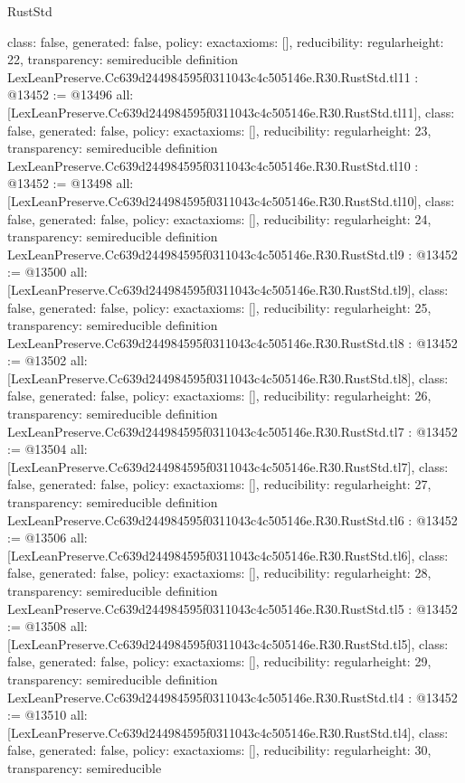 \begin{lexlean}{RustStd}
\begin{coremodule}
{  class: false,
  generated: false,
  policy: exact{axioms: []},
  reducibility: regular{height: 22},
  transparency: semireducible
}
definition LexLeanPreserve.Cc639d244984595f0311043c4c505146e.R30.RustStd.tl11 : @13452 := @13496 {
  all: [LexLeanPreserve.Cc639d244984595f0311043c4c505146e.R30.RustStd.tl11],
  class: false,
  generated: false,
  policy: exact{axioms: []},
  reducibility: regular{height: 23},
  transparency: semireducible
}
definition LexLeanPreserve.Cc639d244984595f0311043c4c505146e.R30.RustStd.tl10 : @13452 := @13498 {
  all: [LexLeanPreserve.Cc639d244984595f0311043c4c505146e.R30.RustStd.tl10],
  class: false,
  generated: false,
  policy: exact{axioms: []},
  reducibility: regular{height: 24},
  transparency: semireducible
}
definition LexLeanPreserve.Cc639d244984595f0311043c4c505146e.R30.RustStd.tl9 : @13452 := @13500 {
  all: [LexLeanPreserve.Cc639d244984595f0311043c4c505146e.R30.RustStd.tl9],
  class: false,
  generated: false,
  policy: exact{axioms: []},
  reducibility: regular{height: 25},
  transparency: semireducible
}
definition LexLeanPreserve.Cc639d244984595f0311043c4c505146e.R30.RustStd.tl8 : @13452 := @13502 {
  all: [LexLeanPreserve.Cc639d244984595f0311043c4c505146e.R30.RustStd.tl8],
  class: false,
  generated: false,
  policy: exact{axioms: []},
  reducibility: regular{height: 26},
  transparency: semireducible
}
definition LexLeanPreserve.Cc639d244984595f0311043c4c505146e.R30.RustStd.tl7 : @13452 := @13504 {
  all: [LexLeanPreserve.Cc639d244984595f0311043c4c505146e.R30.RustStd.tl7],
  class: false,
  generated: false,
  policy: exact{axioms: []},
  reducibility: regular{height: 27},
  transparency: semireducible
}
definition LexLeanPreserve.Cc639d244984595f0311043c4c505146e.R30.RustStd.tl6 : @13452 := @13506 {
  all: [LexLeanPreserve.Cc639d244984595f0311043c4c505146e.R30.RustStd.tl6],
  class: false,
  generated: false,
  policy: exact{axioms: []},
  reducibility: regular{height: 28},
  transparency: semireducible
}
definition LexLeanPreserve.Cc639d244984595f0311043c4c505146e.R30.RustStd.tl5 : @13452 := @13508 {
  all: [LexLeanPreserve.Cc639d244984595f0311043c4c505146e.R30.RustStd.tl5],
  class: false,
  generated: false,
  policy: exact{axioms: []},
  reducibility: regular{height: 29},
  transparency: semireducible
}
definition LexLeanPreserve.Cc639d244984595f0311043c4c505146e.R30.RustStd.tl4 : @13452 := @13510 {
  all: [LexLeanPreserve.Cc639d244984595f0311043c4c505146e.R30.RustStd.tl4],
  class: false,
  generated: false,
  policy: exact{axioms: []},
  reducibility: regular{height: 30},
  transparency: semireducible
}
\end{coremodule}
\end{lexlean}
